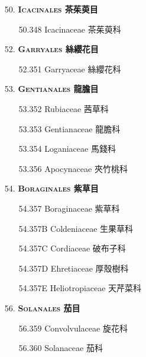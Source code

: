 \footnotesize\selectfont
\begin{enumerate}
  \item[50. ] \textbf{\textsc{Icacinales} 茶茱萸目} 
    \begin{enumerate}
      \item[50.348] Icacinaceae 茶茱萸科  
        
    \end{enumerate}
  \item[52. ] \textbf{\textsc{Garryales} 絲纓花目} 
    \begin{enumerate}
      \item[52.351] Garryaceae 絲纓花科  
        
    \end{enumerate}
  \item[53. ] \textbf{\textsc{Gentianales} 龍膽目} 
    \begin{enumerate}
      \item[53.352] Rubiaceae 茜草科  
        
      \item[53.353] Gentianaceae 龍膽科  
        
      \item[53.354] Loganiaceae 馬錢科  
        
      \item[53.356] Apocynaceae 夾竹桃科  
        
    \end{enumerate}
  \item[54. ] \textbf{\textsc{Boraginales} 紫草目} 
    \begin{enumerate}
      \item[54.357] Boraginaceae 紫草科  
        
      \item[54.357B] Coldeniaceae 生果草科  
        
      \item[54.357C] Cordiaceae 破布子科  
        
      \item[54.357D] Ehretiaceae 厚殼樹科  
        
      \item[54.357E] Heliotropiaceae 天芹菜科  
        
    \end{enumerate}
  \item[56. ] \textbf{\textsc{Solanales} 茄目} 
    \begin{enumerate}
      \item[56.359] Convolvulaceae 旋花科  
        
      \item[56.360] Solanaceae 茄科  
        

\end{enumerate}
\end{enumerate}
